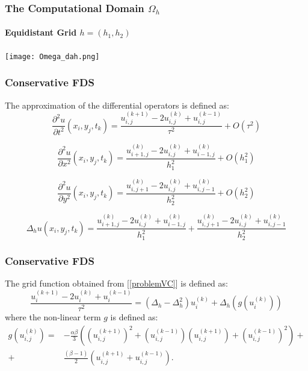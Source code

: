 \documentclass{beamer}
\begin{document}

\begin{frame}
\frametitle{The Computational Domain $\Omega_h$}
\framesubtitle{Equidistant Grid $h=(h_1, h_2)$}
\begin{center}\vspace{0.4cm}
	\begin{minipage}[b]{0.6\linewidth}
		\texttt{[image: Omega\_dah.png]}
	\end{minipage}
\end{center}

\end{frame}


\begin{frame}
\frametitle{Conservative FDS}
The approximation of the differential operators is defined as:
\begin{equation}
\frac{\partial^2 u}{\partial t^2}(x_i, y_j, t_k ) = \frac{ u^{(k+1)}_{i, j} - 2u^{(k)}_{i,j} + u^{(k-1)}_{i,j} }{\tau^2} + O(\tau^2) 
\end{equation}

\begin{equation}
\frac{\partial^2 u}{\partial x^2}(x_i, y_j, t_k ) = \frac{ u^{(k)}_{i+1, j} - 2u^{(k)}_{i,j} + u^{(k)}_{i-1,j} }{h_1^2} + O(h_1^2) 
\end{equation}

\begin{equation}
\frac{\partial^2 u}{\partial y^2}(x_i, y_j, t_k ) = \frac{ u^{(k)}_{i, j+1} - 2u^{(k)}_{i,j} + u^{(k)}_{i,j-1} }{h_2^2} + O(h_2^2) 
\end{equation}


\begin{equation}
\Delta_h u(x_i, y_j, t_k )  = \frac{ u^{(k)}_{i+1, j} - 2u^{(k)}_{i,j} + u^{(k)}_{i-1,j} }{h_1^2} + \frac{ u^{(k)}_{i, j+1} - 2u^{(k)}_{i,j} + u^{(k)}_{i,j-1} }{h_2^2}
\end{equation}

\end{frame}


\begin{frame}
\frametitle{Conservative FDS}
The grid function obtained from [\ref{problemVC}] is defined as:
\begin{equation}
\frac{ u^{(k+1)}_{i} - 2u^{(k)}_{i} + u^{(k-1)}_{i} }{\tau^2} = (\Delta_h - \Delta_h^2)u^{(k)}_{i} + \Delta_h(g(u^{(k)}_{i}))
\end{equation}
%
where the non-linear term $g$ is defined as:
\begin{align}
g(u^{(k)}_{i,j})=& -\frac{\alpha \beta} { 3 } \left( (u^{(k+1)}_{i,j})^2 + (u^{(k-1)}_{i,j})(u^{(k+1)}_{i,j}) + (u^{(k-1)}_{i,j})^2 \right) + \nonumber\\
+&\frac{ (\beta - 1 )}{ 2 }\left( u^{(k+1)}_{i,j} + u^{(k-1)}_{i,j} \right).
\end{align}


\end{frame}
\end{document}
